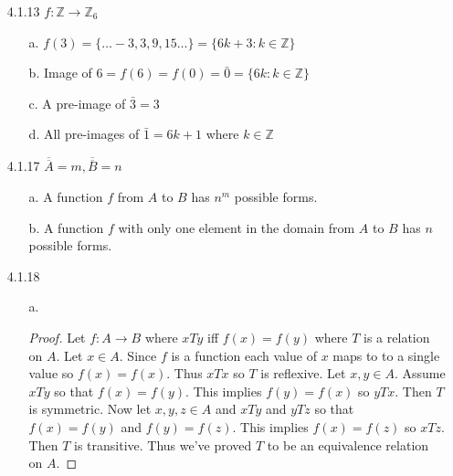 \documentclass[11pt]{amsart}
\theoremstyle{definition}
\begin{document}
\begin{itemize}
\begin{proof}
    \paragraph{($\subseteq$):} Let $(x,y)\in f$ this means that $f(x)=y$. Since $f(x)=g(x)\implies g(x)=y$ this means $(x,y)\in g$. Thus $f\subseteq g$.
    \paragraph{($\subseteq$):} Let $(x,y)\in g$ this means that $g(x)=y$. Since $f(x)=g(x)\implies f(x)=y$ this means $(x,y)\in f$. Thus $g\subseteq f$.\\
    Thus we've shown that $f=g$ by double containment, if $\text{Dom}(f)=\text{Dom}(g)$ and for all $x\in\text{Dom}(f),f(x)=g(x)$.
\end{proof}

\item[4.1.13] $f:\mathbb{Z}\to\mathbb{Z}_6$
\begin{itemize}
    \item[a.] $f(3)=\{\ldots-3,3,9,15\ldots\}=\{6k+3:k\in\mathbb{Z}\}$

    \item[b.] Image of $6=f(6)=f(0)=\bar0=\{6k:k\in\mathbb{Z}\}$

    \item[c.] A pre-image of $\bar 3=3$

    \item[d.] All pre-images of $\bar 1=6k+1$ where $k\in\mathbb{Z}$

\end{itemize}

\item[4.1.17] $\overline{\overline A}=m,\overline{\overline B}=n$
\begin{itemize}
    \item[a.] A function $f$ from $A$ to $B$ has $n^m$ possible forms.

    \item[b.] A function $f$ with only one element in the domain from $A$ to $B$ has $n$ possible forms.

\end{itemize}

\item[4.1.18]
\begin{itemize}
    \item[a.] \begin{proof}
        Let $f:A\to B$ where $xTy$ iff $f(x)=f(y)$ where $T$ is a relation on $A$.
        Let $x\in A$. Since $f$ is a function each value of $x$ maps to to a single value so $f(x)=f(x)$. Thus $xTx$ so $T$ is reflexive.
        Let $x,y\in A$. Assume $xTy$ so that $f(x)=f(y)$. This implies $f(y)=f(x)$ so $yTx$. Then $T$ is symmetric.
        Now let $x,y,z\in A$ and $xTy$ and $yTz$ so that $f(x)=f(y)$ and $f(y)=f(z)$. This implies $f(x)=f(z)$ so $xTz$. Then $T$ is transitive.
        Thus we've proved $T$ to be an equivalence relation on $A$.
    \end{proof}


\end{itemize}
\end{itemize}
\end{document}
